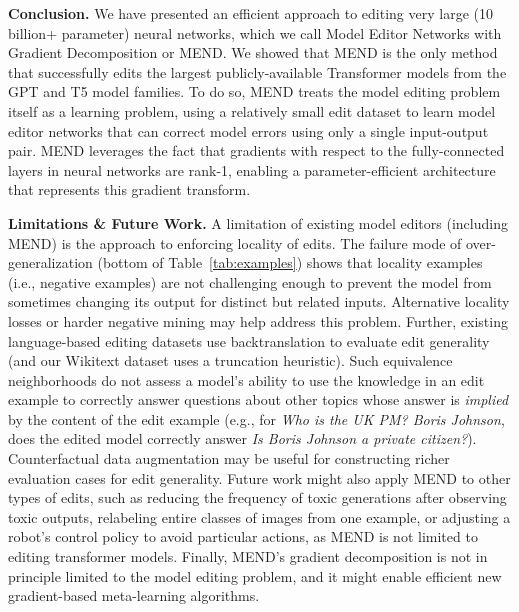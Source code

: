 \documentclass{article}
\newcommand{\fullname}{Model Editor Networks with Gradient Decomposition}
\newcommand{\name}{MEND}
\begin{document}
\textbf{Conclusion.} We have presented an efficient approach to editing very large (10 billion+ parameter) neural networks, which we call {\fullname} or \name. We showed that {\name} is the only method that successfully edits the largest publicly-available Transformer models from the GPT and T5 model families. To do so, {\name} treats the model editing problem itself as a learning problem, using a relatively small edit dataset to learn model editor networks that can correct model errors using only a single input-output pair. {\name} leverages the fact that gradients with respect to the fully-connected layers in neural networks are rank-1, enabling a parameter-efficient architecture that represents this gradient transform.

\textbf{Limitations \& Future Work.} A limitation of existing model editors (including \name) is the approach to enforcing locality of edits. The failure mode of over-generalization (bottom of Table~\ref{tab:examples}) shows that locality examples (i.e., negative examples) are not challenging enough to prevent the model from sometimes changing its output for distinct but related inputs. Alternative locality losses or harder negative mining may help address this problem. Further, existing language-based editing datasets use backtranslation to evaluate edit generality (and our Wikitext dataset uses a truncation heuristic). Such equivalence neighborhoods do not assess a model's ability to use the knowledge in an edit example to correctly answer questions about other topics whose answer is \textit{implied} by the content of the edit example (e.g., for \textit{Who is the UK PM? Boris Johnson}, does the edited model correctly answer \textit{Is Boris Johnson a private citizen?}). Counterfactual data augmentation \citep{Kaushik2020Learning} may be useful for constructing richer evaluation cases for edit generality. Future work might also apply {\name} to other types of edits, such as reducing the frequency of toxic generations after observing toxic outputs, relabeling entire classes of images from one example, or adjusting a robot's control policy to avoid particular actions, as {\name} is not limited to editing transformer models. Finally, \name's gradient decomposition is not in principle limited to the model editing problem, and it might enable efficient new gradient-based meta-learning algorithms.

\newpage
\end{document}
